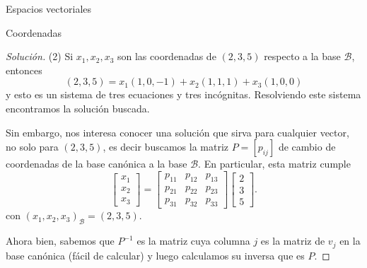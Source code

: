 \documentclass[a4paper,12pt,twoside,spanish,reqno]{amsbook}
\theoremstyle{definition}
\theoremstyle{remark}
\begin{document}
\begin{chapter}{Espacios vectoriales}
\begin{section}{Coordenadas}
\begin{proof}[Solución]
    (2) Si $x_1,x_2,x_3$  son las coordenadas de $(2,3,5)$ respecto a la base  $\mathcal{B}$, entonces
    $$
    (2,3,5) = x_1(1,0,-1)+x_2(1,1,1)+x_3(1,0,0)
    $$
    y esto es un sistema de tres ecuaciones y tres incógnitas.  Resolviendo este sistema encontramos la solución buscada. 
    
    Sin embargo,  nos interesa conocer una solución que sirva para cualquier vector, no solo para $(2,3,5)$, es decir buscamos la matriz $P = [p_{ij}]$ de cambio de coordenadas de la base canónica a la base $\mathcal B$. En particular,  esta matriz cumple 
    $$
    \begin{bmatrix} x_1\\x_2\\x_3 \end{bmatrix} = 
    \begin{bmatrix}p_{11} &p_{12}& p_{13} \\p_{21} &p_{22} & p_{23}\\ p_{31} &p_{32}& p_{33}\end{bmatrix}
    \begin{bmatrix} 2\\3\\5 \end{bmatrix}.
    $$
    con $(x_1,x_2,x_3)_{\mathcal B} = (2,3,5)$.
    
    
    Ahora bien, sabemos que $P^{-1}$ es la matriz cuya columna $j$ es la matriz de $v_j$ en la base canónica (fácil de calcular) y luego calculamos su inversa que es $P$.
    

\end{proof}
\end{section}
\end{chapter}
\end{document}
